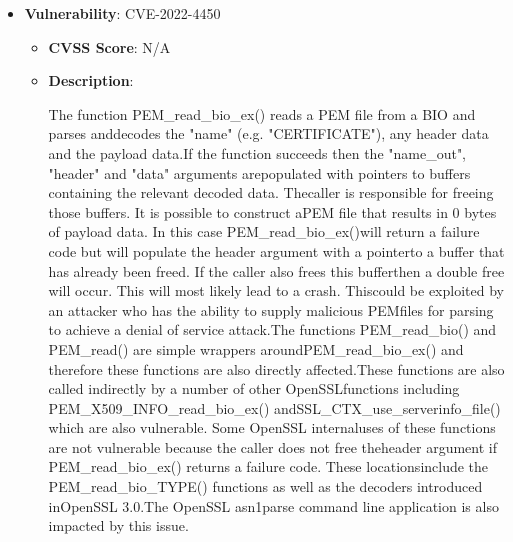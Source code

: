 \documentclass{article}
\begin{document}
\begin{itemize}
        \item \textbf{Vulnerability}: CVE-2022-4450
        \begin{itemize}
            \item \textbf{CVSS Score}:  N/A 
            \item \textbf{Description}:
            \parbox[t]{0.9\linewidth}{
                \ttfamily The function PEM\_read\_bio\_ex() reads a PEM file from a BIO and parses anddecodes the "name" (e.g. "CERTIFICATE"), any header data and the payload data.If the function succeeds then the "name\_out", "header" and "data" arguments arepopulated with pointers to buffers containing the relevant decoded data. Thecaller is responsible for freeing those buffers. It is possible to construct aPEM file that results in 0 bytes of payload data. In this case PEM\_read\_bio\_ex()will return a failure code but will populate the header argument with a pointerto a buffer that has already been freed. If the caller also frees this bufferthen a double free will occur. This will most likely lead to a crash. Thiscould be exploited by an attacker who has the ability to supply malicious PEMfiles for parsing to achieve a denial of service attack.The functions PEM\_read\_bio() and PEM\_read() are simple wrappers aroundPEM\_read\_bio\_ex() and therefore these functions are also directly affected.These functions are also called indirectly by a number of other OpenSSLfunctions including PEM\_X509\_INFO\_read\_bio\_ex() andSSL\_CTX\_use\_serverinfo\_file() which are also vulnerable. Some OpenSSL internaluses of these functions are not vulnerable because the caller does not free theheader argument if PEM\_read\_bio\_ex() returns a failure code. These locationsinclude the PEM\_read\_bio\_TYPE() functions as well as the decoders introduced inOpenSSL 3.0.The OpenSSL asn1parse command line application is also impacted by this issue.
            }
        \end{itemize}
    

\end{itemize}
\end{document}
